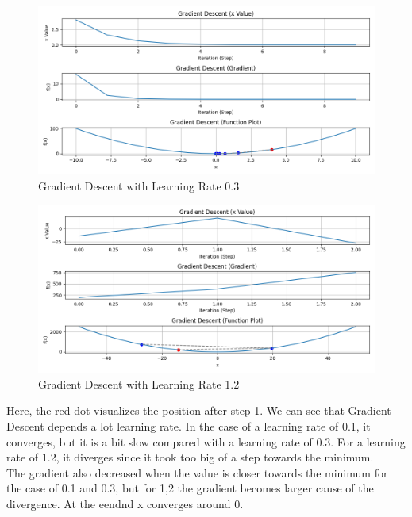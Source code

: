 \documentclass{article}
\begin{document}
\begin{figure}[ht!]
  \centering
  \includegraphics[width=1\textwidth]{images/lab1/gradient_descent_lr(0.3).png}
  \caption{Gradient Descent with Learning Rate 0.3}
  \label{fig:lr_0.3}
\end{figure}

\begin{figure}[ht!]
  \centering
  \includegraphics[width=1\textwidth]{images/lab1/gradient_descent_lr(1.2).png}
  \caption{Gradient Descent with Learning Rate 1.2}
  \label{fig:lr_1.2}
\end{figure}

\noindent Here, the red dot visualizes the position after step 1. We can see that Gradient Descent depends a lot learning rate. In the case of a learning rate of 0.1, it converges, but it is a bit slow compared with a learning rate of 0.3. For a learning rate of 1.2, it diverges since it took too big of a step towards the minimum.\\
\noindent The gradient also decreased when the value is closer towards the minimum for the case of 0.1 and 0.3, but for 1,2 the gradient becomes larger cause of the divergence. At the eendnd x converges around 0.
\end{document}
